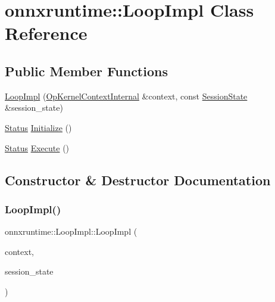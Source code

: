 \hypertarget{classonnxruntime_1_1LoopImpl}{}\section{onnxruntime\+:\+:Loop\+Impl Class Reference}
\label{classonnxruntime_1_1LoopImpl}
\subsection*{Public Member Functions}
\begin{DoxyCompactItemize}
\item 
\mbox{\hyperlink{classonnxruntime_1_1LoopImpl_aa1eb6658ebc973e5603cfb7ccfd8817e}{Loop\+Impl}} (\mbox{\hyperlink{classonnxruntime_1_1OpKernelContextInternal}{Op\+Kernel\+Context\+Internal}} \&context, const \mbox{\hyperlink{classonnxruntime_1_1SessionState}{Session\+State}} \&session\+\_\+state)
\item 
\mbox{\hyperlink{classonnxruntime_1_1common_1_1Status}{Status}} \mbox{\hyperlink{classonnxruntime_1_1LoopImpl_a8611abe8455986416550b0b56d992880}{Initialize}} ()
\item 
\mbox{\hyperlink{classonnxruntime_1_1common_1_1Status}{Status}} \mbox{\hyperlink{classonnxruntime_1_1LoopImpl_a4a7ddb8fecbb04ab5e9b37eb2e88b366}{Execute}} ()
\end{DoxyCompactItemize}


\subsection{Constructor \& Destructor Documentation}
\mbox{\label{classonnxruntime_1_1LoopImpl_aa1eb6658ebc973e5603cfb7ccfd8817e}} 
\subsubsection{\texorpdfstring{Loop\+Impl()}{LoopImpl()}}
{\footnotesize\ttfamily onnxruntime\+::\+Loop\+Impl\+::\+Loop\+Impl (\begin{DoxyParamCaption}\item[{\mbox{\hyperlink{classonnxruntime_1_1OpKernelContextInternal}{Op\+Kernel\+Context\+Internal}} \&}]{context,  }\item[{const \mbox{\hyperlink{classonnxruntime_1_1SessionState}{Session\+State}} \&}]{session\+\_\+state }\end{DoxyParamCaption})}



